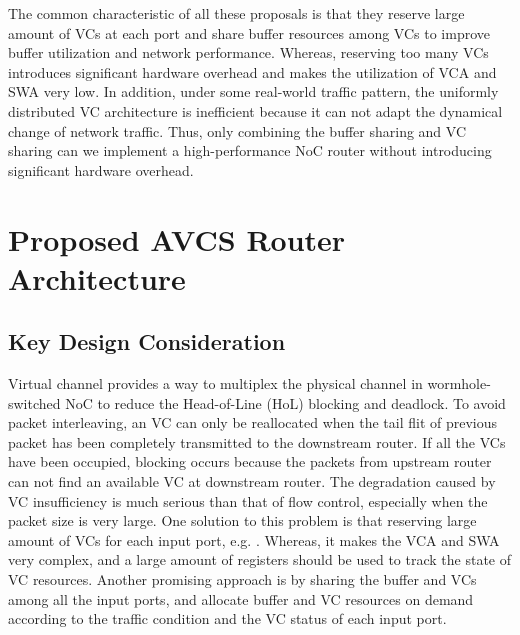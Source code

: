 \documentclass[paper]{ieice}
\begin{document}
The common characteristic of all these proposals is that they reserve large amount of VCs at each port and share buffer resources among VCs to improve buffer utilization and network performance. Whereas, reserving too many VCs introduces significant hardware overhead and makes the utilization of VCA and SWA very low. In addition, under some real-world traffic pattern, the uniformly distributed VC architecture is inefficient because it can not adapt the dynamical change of network traffic. Thus, only combining the buffer sharing and VC sharing can we implement a high-performance NoC router without introducing significant hardware overhead.

\section{Proposed AVCS Router Architecture}\label{implemented}
\subsection{Key Design Consideration}
Virtual channel provides a way to multiplex the physical channel in wormhole-switched NoC to reduce the Head-of-Line (HoL) blocking and deadlock. To avoid packet interleaving, an VC can only be reallocated when the tail flit of previous packet has been completely transmitted to the downstream router. If all the VCs have been occupied, blocking occurs because the packets from upstream router can not find an available VC at downstream router. The degradation caused by VC insufficiency is much serious than that of flow control, especially when the packet size is very large. One solution to this problem is that reserving large amount of VCs for each input port, e.g. \cite{NPKV06}\cite{4555894}\cite{5770788}\cite{Neishaburi:2009:RAN:1531542.1531658}\cite{6310960}. Whereas, it makes the VCA and SWA very complex, and a large amount of registers should be used to track the state of VC resources. Another promising approach is by sharing the buffer and VCs among all the input ports, and allocate buffer and VC resources on demand according to the traffic condition and the VC status of each input port.
\end{document}
